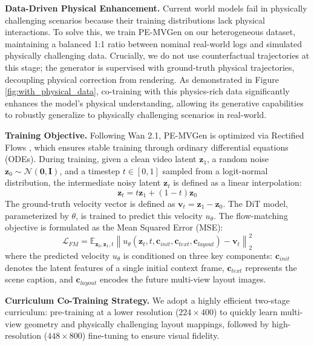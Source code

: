 \documentclass[runningheads]{llncs}
\begin{document}
\setlength{\parskip}{1pt}
\noindent \textbf{Data-Driven Physical Enhancement.} Current world models fail in physically challenging scenarios because their training distributions lack physical interactions. To solve this, we train PE-MVGen on our heterogeneous dataset, maintaining a balanced 1:1 ratio between nominal real-world logs and simulated physically challenging data. Crucially, we do not use counterfactual trajectories at this stage; the generator is supervised with ground-truth physical trajectories, decoupling physical correction from rendering. As demonstrated in Figure \ref{fig:with_physical_data}, co-training with this physics-rich data significantly enhances the model's physical understanding, allowing its generative capabilities to robustly generalize to physically challenging scenarios in real-world. \cite{ge2025unraveling,fang2025rebot}

\setlength{\parskip}{1pt}
\noindent \textbf{Training Objective.} Following Wan 2.1, PE-MVGen is optimized via Rectified Flows \cite{esser2024scaling}, which ensures stable training through ordinary differential equations (ODEs). During training, given a clean video latent $\mathbf{z}_1$, a random noise $\mathbf{z}_0 \sim \mathcal{N}(\mathbf{0}, \mathbf{I})$, and a timestep $t \in [0,1]$ sampled from a logit-normal distribution, the intermediate noisy latent $\mathbf{z}_t$ is defined as a linear interpolation:
\begin{equation}
    \mathbf{z}_t = t\mathbf{z}_1 + (1 - t)\mathbf{z}_0
\end{equation}
The ground-truth velocity vector is defined as $\mathbf{v}_t = \mathbf{z}_1 - \mathbf{z}_0$. The DiT model, parameterized by $\theta$, is trained to predict this velocity $u_\theta$. The flow-matching objective is formulated as the Mean Squared Error (MSE):
\begin{equation}
    \mathcal{L}_{FM} = \mathbb{E}_{\mathbf{z}_0, \mathbf{z}_1, t} \left\| u_\theta(\mathbf{z}_t, t, \mathbf{c}_{init}, \mathbf{c}_{text}, \mathbf{c}_{layout}) - \mathbf{v}_t \right\|_2^2
\end{equation}
where the predicted velocity $u_\theta$ is conditioned on three key components: $\mathbf{c}_{init}$ denotes the latent features of a single initial context frame, $\mathbf{c}_{text}$ represents the scene caption, and $\mathbf{c}_{layout}$ encodes the future multi-view layout images.

\setlength{\parskip}{1pt}
\noindent \textbf{Curriculum Co-Training Strategy.} We adopt a highly efficient two-stage curriculum: pre-training at a lower resolution ($224 \times 400$) to quickly learn multi-view geometry and physically challenging layout mappings, followed by high-resolution ($448 \times 800$) fine-tuning to ensure visual fidelity. 
\end{document}
